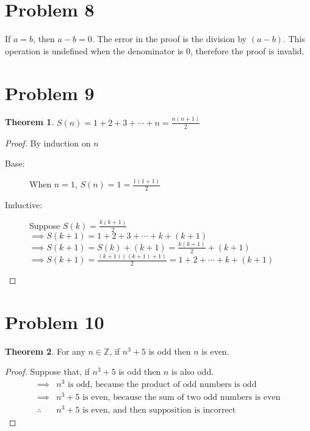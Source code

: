 \documentclass{article}
\newenvironment{problem}[1]{
  \nobreak\section*{Problem #1}
}{}
\begin{document}
  \begin{problem}{8}
    If $a = b$, then $a - b = 0$.  The error in the proof is the
    division by $(a - b)$.  This operation is undefined when the
    denominator is $0$, therefore the proof is invalid.
  \end{problem}

  \begin{problem}{9}
    \theoremstyle{definition}
    \newtheorem*{theorem}{Theorem}

    \begin{theorem}
      $S(n) = 1 + 2 + 3 + \dotsb + n = \frac{n(n+1)}{2}$
    \end{theorem}

    \begin{proof}
      By induction on $n$

      \begin{description}
        \item[Base:] When $n = 1$, $S(n) = 1 = \frac{1(1 + 1)}{2}$
        \item[Inductive:] Suppose $S(k) = \frac{k(k + 1)}{2}$\\
        $\implies S(k + 1) = 1 + 2 + 3 + \dotsb + k + (k + 1)$\\
        $\implies S(k + 1) = S(k) + (k + 1) = \frac{k(k + 1)}{2} + (k + 1)$\\
        $\implies S(k + 1) = \frac{(k + 1)((k + 1) + 1)}{2} = 1 + 2 + \dotsb + k + (k + 1)$  
      \end{description}
    \end{proof}
  \end{problem}

  \begin{problem}{10}
    \begin{theorem}
      For any $n \in \mathbb{Z}$, if $n^3+5$ is odd then $n$ is even.
    \end{theorem}

    \begin{proof}
      Suppose that, if $n^3+5$ is odd then $n$ is also odd.
      \begin{equation*}
        \begin{split}
          \implies & n^3 \text{ is odd, because the product of odd numbers is odd}\\
          \implies & n^3 + 5 \text{ is even, because the sum of two odd numbers is even}\\
          \therefore{} & n^3 + 5 \text{ is even, and then supposition is incorrect}
        \end{split}
      \end{equation*}
    \end{proof}
  \end{problem}
\end{document}
